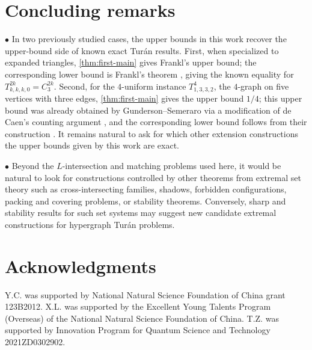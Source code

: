 \documentclass[10pt,a4paper]{article}
\theoremstyle{plain}
\theoremstyle{definition}
\theoremstyle{plain}
\begin{document}
\section{Concluding remarks}

$\bullet$ In two previously studied cases, the upper bounds in this work recover the upper-bound side of known exact Tur\'an results.  First, when specialized to expanded triangles, \cref{thm:first-main} gives Frankl's upper bound; the corresponding lower bound is Frankl's theorem \cite{Frankl90}, giving the known equality for $T^{2k}_{k,k,k,0}=C^{2k}_3$. 
Second, for the $4$-uniform instance $T^4_{1,3,3,2}$, the $4$-graph on five vertices with three edges, \cref{thm:first-main} gives the upper bound $1/4$; this upper bound was already obtained by Gunderson--Semeraro via a modification of de Caen's counting argument \cite{deCaen83,GundersonSemeraro17}, and the corresponding lower bound follows from their construction \cite{GundersonSemeraro17}.  It remains natural to ask for which other extension constructions the upper bounds given by this work are exact.

$\bullet$  Beyond the $L$-intersection and matching problems used here, it would be natural to look for constructions controlled by other theorems from extremal set theory such as cross-intersecting families, shadows, forbidden configurations, packing and covering problems, or stability theorems.  Conversely, sharp and stability results for such set systems may suggest new candidate extremal constructions for hypergraph Tur\'an problems.

\section*{Acknowledgments}
Y.C. was supported by National Natural Science Foundation of China grant 123B2012.
X.L. was supported by the Excellent Young Talents Program (Overseas) of the National Natural Science Foundation of China.
T.Z. was supported by Innovation Program for Quantum Science and Technology 2021ZD0302902.



\end{document}
